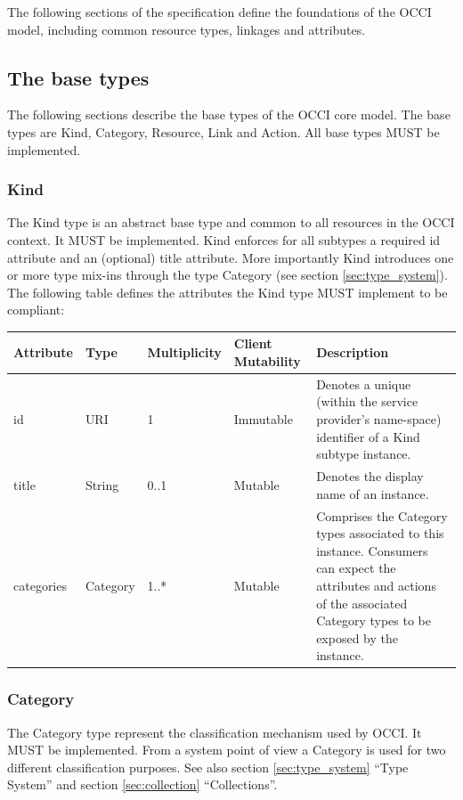 \documentclass[10pt,a4paper]{article}
\begin{document}
The following sections of the specification define the foundations of
the OCCI model, including common resource types, linkages and
attributes.

\subsection{The base types}
The following sections describe the base types of the OCCI core
model. The base types are Kind, Category, Resource, Link and
Action. All base types MUST be implemented.

\subsubsection{Kind}
The Kind type is an abstract base type and common to all resources in
the OCCI context. It MUST be implemented. Kind enforces for all
subtypes a required id attribute and an (optional) title
attribute. More importantly Kind introduces one or more type mix-ins
through the type Category (see section \ref{sec:type_system}). The
following table defines the attributes the Kind type MUST implement to
be compliant:

\begin{tabular}{l|l|l|l|p{2.7in}}
Attribute & Type & Multiplicity & Client Mutability & Description \\
\hline
id & URI & 1 & Immutable & Denotes a unique (within the service provider's name-space) identifier of a Kind subtype instance. \\
title & String & 0..1 & Mutable & Denotes the display name of an instance. \\
categories & Category & 1..* & Mutable\footnotemark[1] & Comprises the Category types associated to this instance. Consumers can expect the attributes and actions of the associated Category types to be exposed by the instance. \\ 
\end{tabular}
\addtocounter{footnote}{1}

\subsubsection{Category}
The Category type represent the classification mechanism used by
OCCI. It MUST be implemented. From a system point of view a Category
is used for two different classification purposes. See also section
\ref{sec:type_system} ``Type System'' and section \ref{sec:collection}
``Collections''.
\end{document}
